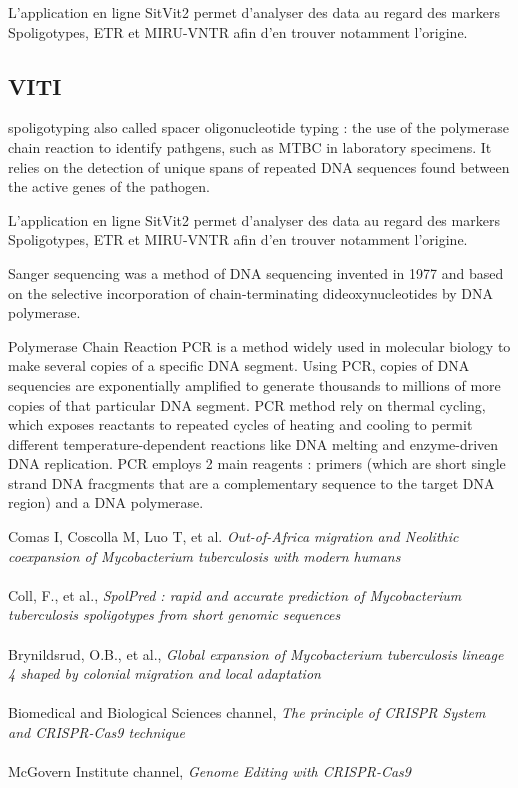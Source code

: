 \documentclass[twoside,a4paper,12pt,frenchb,openany]{report}
\begin{document}
L'application en ligne SitVit2 permet d'analyser des data au regard des markers Spoligotypes, ETR et MIRU-VNTR afin d'en trouver notamment l'origine.

\subsection{VITI}

spoligotyping also called spacer oligonucleotide typing : the use of the polymerase chain reaction to identify pathgens, such as MTBC in laboratory specimens. It relies on the detection of unique spans of repeated DNA sequences found between the active genes of the pathogen.

L'application en ligne SitVit2 permet d'analyser des data au regard des markers Spoligotypes, ETR et MIRU-VNTR afin d'en trouver notamment l'origine.

Sanger sequencing was a method of DNA sequencing invented in 1977 and based on the selective incorporation of chain-terminating dideoxynucleotides by DNA polymerase.

Polymerase Chain Reaction PCR is a method widely used in molecular biology to make several copies of a specific DNA segment. Using PCR, copies of DNA sequencies are exponentially amplified to generate thousands to millions of more copies of that particular DNA segment. PCR method rely on thermal cycling, which exposes reactants to repeated cycles of heating and cooling to permit different temperature-dependent reactions like DNA melting and enzyme-driven DNA replication. PCR employs 2 main reagents : primers (which are short single strand DNA fracgments that are a complementary sequence to the target DNA region) and a DNA polymerase.



\renewcommand{\bibname}{Références}
\begin{thebibliography}{10}
\bibitem{}Comas I, Coscolla M, Luo T, et al. \textit{Out-of-Africa migration and Neolithic coexpansion of Mycobacterium tuberculosis with modern humans}\\ \\

\bibitem{}Coll, F., et al., \textit{SpolPred : rapid and accurate prediction of Mycobacterium tuberculosis spoligotypes from short genomic sequences}\\ \\

\bibitem{}Brynildsrud, O.B., et al., \textit{Global expansion of Mycobacterium tuberculosis lineage 4 shaped by colonial migration and local adaptation}\\ \\

\bibitem{}Biomedical and Biological Sciences channel, \textit{The principle of CRISPR System and CRISPR-Cas9 technique}\\ \\

\bibitem{}McGovern Institute channel, \textit{Genome Editing with CRISPR-Cas9}\\ \\


\end{thebibliography}
\end{document}
